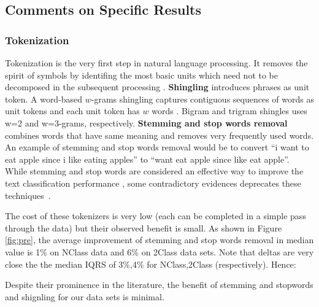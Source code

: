 \documentclass{sig-alternate-05-2015}
\theoremstyle{break}
\begin{document}
\subsection{Comments on Specific Results}
\label{sect:Experiment}

\subsubsection{Tokenization}

Tokenization is the very first step in natural language processing. It removes the spirit of symbols by identifing the most basic units which need not to be decomposed in the subsequent processing \cite{webster1992tokenization}. 
\textbf{Shingling} introduces phrases as unit token. A word-based $w$-grams shingling captures contiguous sequences of words as unit tokens and each unit token has $w$ words \cite{chang2009using}. Bigram and trigram shingles uses w=2 and w=3-grams, respectively.
\textbf{Stemming and stop words removal} combines words that have same meaning and removes  very frequently used words. An example of stemming and stop words removal 
would be to convert ``i want to eat apple since i like eating apples'' to
``want eat apple since like eat apple''.
While stemming and stop words are considered  an effective way to improve the text classification performance \cite{yang1997comparative},  some contradictory evidences deprecates these techniques~\cite{moharanatag,stanley2013predicting}. 



 
The   cost of these tokenizers is very low (each can be completed in a simple pass
through the data) but their observed   benefit is small.
As shown in Figure \ref{fig:pre}, the average improvement of stemming and stop words removal in median value is 1\% on NClass data  and 6\% on 2Class  data sets.
Note that  deltas are very close the the median IQRS of 3\%,4\% for NClass,2Class (respectively).  Hence:
\begin{lesson}
Despite their prominence in the literature, the benefit of stemming and stopwords
and shignling for our data sets  is minimal.
\end{lesson}
\end{document}

